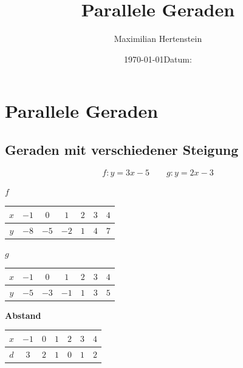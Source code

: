 \documentclass[a4paper]{scrartcl}
\author{Maximilian Hertenstein}
\date{\today}
\title{Parallele Geraden}
\date{Datum: \hspace{1.5cm}}
\begin{document}
\section*{Parallele Geraden}

\subsection*{Geraden mit verschiedener Steigung}
$$f\colon y= 3x -5 \qquad g\colon y= 2x -3$$

\begin{minipage}{0.5\linewidth}
\end{minipage}
\hfill
\begin{minipage}{0.56\linewidth}
\small\renewcommand{\arraystretch}{1.2}
\textbf{$f$}\\[0.5mm]
\begin{tabular}{|c|c|c|c|c|c|c|}
\hline
$x$ & $-1$ & $0$ & $1$ & $2$ & $3$ & $4$ \\
\hline
$y$ & $-8$ & $-5$ & $-2$ & $1$ & $4$ & $7$ \\
\hline
\end{tabular}

\medskip
\textbf{$g$}\\[0.5mm]
\begin{tabular}{|c|c|c|c|c|c|c|}
\hline
$x$ & $-1$ & $0$ & $1$ & $2$ & $3$ & $4$ \\
\hline
$y$ & $-5$ & $-3$ & $-1$ & $1$ & $3$ & $5$ \\
\hline
\end{tabular}

\medskip
\textbf{Abstand}\\[0.5mm]
\begin{tabular}{|c|c|c|c|c|c|c|}
\hline
$x$ & $-1$ & $0$ & $1$ & $2$ & $3$ & $4$ \\
\hline
$d$ & $3$ & $2$ & $1$ & $0$ & $1$ & $2$ \\
\hline
\end{tabular}
\end{minipage}
\end{document}
